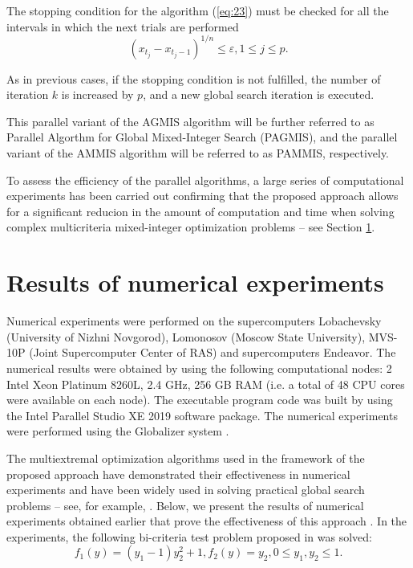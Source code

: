 \documentclass{svproc}
\begin{document}
The stopping condition for the algorithm (\ref{eq:23}) must be checked for all the intervals in which the next trials are performed
\begin{equation}\label{eq:26}
(x_{t_j} - x_{t_j-1})^{1/n} \leq \varepsilon, 1 \leq j \leq p. 
\end{equation}

As in previous cases, if the stopping condition is not fulfilled, the number of iteration $k$ is increased by $p$, and a new global search iteration is executed.
      
This parallel variant of the AGMIS algorithm will be further referred to as Parallel Algorthm for  Global Mixed-Integer Search (PAGMIS), and the parallel variant of the AMMIS algorithm will be referred to as PAMMIS, respectively.

To assess the efficiency of the parallel algorithms, a large series of computational experiments has been carried out confirming that the proposed approach allows for a significant reducion in the amount of computation and time when solving complex multicriteria mixed-integer optimization problems -- see Section \ref{sec:5}.



\section{Results of numerical experiments}\label{sec:5}

Numerical experiments were performed on the supercomputers Lobachevsky (University of Nizhni Novgorod), Lomonosov (Moscow State University), MVS-10P (Joint Supercomputer Center of RAS) and supercomputers Endeavor. The numerical results were obtained by using the following computational nodes: 2 Intel Xeon Platinum 8260L, 2.4 GHz, 256 GB RAM (i.e. a total of 48 CPU cores were available on each node). The executable program code was built by using the Intel Parallel Studio XE 2019 software package. The numerical experiments were performed using the Globalizer system \cite{c41}.

The multiextremal optimization algorithms used in the framework of the proposed approach have demonstrated their effectiveness in numerical experiments and have been widely used in solving practical global search problems -- see, for example, \cite{c20,c21,c22,c23}. Below, we present the results of numerical experiments obtained earlier that prove the effectiveness of this approach \cite{c21}. In the experiments, the following bi-criteria test problem proposed in \cite{c42} was solved:
\begin{equation}\label{eq:27}
f_1(y)=(y_1-1) y_2^2+1,f_2 (y)=y_2, 0 \leq y_1, y_2 \leq 1.
\end{equation}
\end{document}
